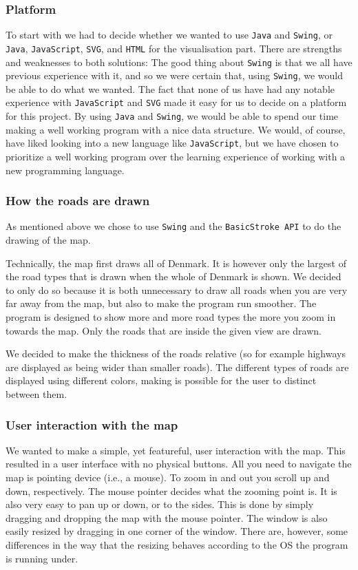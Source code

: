 \subsubsection{Platform}
To start with we had to decide whether we wanted to use \texttt{Java} and \texttt{Swing}, or \texttt{Java}, \texttt{JavaScript}, \texttt{SVG}, and \texttt{HTML} for the visualisation part. There are strengths and weaknesses to both solutions: The good thing about \texttt{Swing} is that we all have previous experience with it, and so we were certain that, using \texttt{Swing}, we would be able to do what we wanted. 
The fact that none of us have had any notable experience with \texttt{JavaScript} and \texttt{SVG} made it easy for us to decide on a platform for this project. By using \texttt{Java} and \texttt{Swing}, we would be able to spend our time making a well working program with a nice data structure. We would, of course, have liked looking into a new language like \texttt{JavaScript}, but we have chosen to prioritize a well working program over the learning experience of working with a new programming language.

\subsubsection{How the roads are drawn}
As mentioned above we chose to use \texttt{Swing} and the \texttt{BasicStroke API} to do the drawing of the map. 

Technically, the map first draws all of Denmark. It is however only the largest of the road types that is drawn when the whole of Denmark is shown. We decided to only do so because it is both unnecessary to draw all roads when you are very far away from the map, but also to make the program run smoother. The program is designed to show more and more road types the more you zoom in towards the map. Only the roads that are inside the given view are drawn.

We decided to make the thickness of the roads relative (so for example highways are displayed as being wider than smaller roads). The different types of roads are displayed using different colors, making is possible for the user to distinct between them.

\subsubsection{User interaction with the map}
We wanted to make a simple, yet featureful, user interaction with the map. This resulted in a user interface with no physical buttons. All you need to navigate the map is pointing device (i.e., a mouse). To zoom in and out you scroll up and down, respectively. The mouse pointer decides what the zooming point is. It is also very easy to pan up or down, or to the sides. This is done by simply dragging and dropping the map with the mouse pointer. The window is also easily resized by dragging in one corner of the window. There are, however, some differences in the way that the resizing behaves according to the OS the program is running under.

